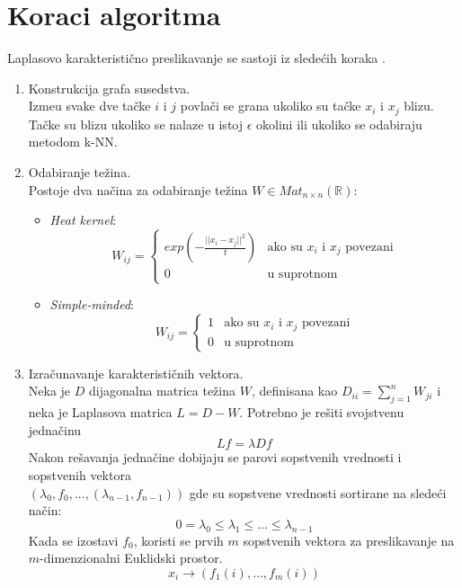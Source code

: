 \section{Koraci algoritma}
Laplasovo karakteristi\v cno preslikavanje se sastoji iz slede\' cih koraka \cite{LaplSteps}.
\begin{enumerate}
    \item Konstrukcija grafa susedstva. \\Izme\dj u svake dve ta\v cke $i$ i $j$ povla\v ci se grana ukoliko su ta\v cke $x_{i}$ i $x_{j}$  blizu. Ta\v cke su blizu ukoliko se nalaze u istoj $\epsilon$ okolini ili ukoliko se odabiraju metodom \textenglish{k-NN}.
    \item Odabiranje te\v zina. \\Postoje dva na\v cina za odabiranje te\v zina $W \in Mat_{n \times n}(\mathbb{R})$:
    \begin{itemize}
        \item {\it\textenglish{Heat kernel}}:
            \begin{equation}
              W_{ij} =
                \begin{cases}
                  exp(-\frac{||x_{i}-x_{j}||^{2}}{t}) & \text{ako su $x_{i}$ i $x_{j}$ povezani}\\
                  0 & \text{u suprotnom}
                \end{cases} 
            \end{equation}
        \item {\it\textenglish{Simple-minded}}:
            \begin{equation}
              W_{ij} =
                \begin{cases}
                  1 & \text{ako su $x_{i}$ i $x_{j}$ povezani}\\
                  0 & \text{u suprotnom}
                \end{cases}
            \end{equation}
    \end{itemize}
    \item Izra\v cunavanje karakteristi\v cnih vektora.\\ Neka je $D$ dijagonalna matrica te\v zina $W$, definisana kao $D_{ii} = \sum_{j=1}^{n} W_{ji}$ i neka je Laplasova matrica $L = D - W$. Potrebno je re\v siti svojstvenu jedna\v cinu $$Lf = \lambda Df$$ Nakon re\v savanja jedna\v cine dobijaju se parovi sopstvenih vrednosti i sopstvenih vektora \\ $(\lambda_{0}, f_{0}, ..., (\lambda_{n-1}, f_{n-1}))$ gde su sopstvene vrednosti sortirane na slede\' ci na\v cin:
    $$0 = \lambda_{0} \leq \lambda_{1} \leq ... \leq \lambda_{n-1} $$ Kada se izostavi $f_{0}$, koristi se prvih $m$ sopstvenih vektora za preslikavanje na $m$-dimenzionalni Euklidski prostor.
    $$x_{i} \rightarrow (f_{1}(i), ..., f_{m}(i))$$
\end{enumerate}

